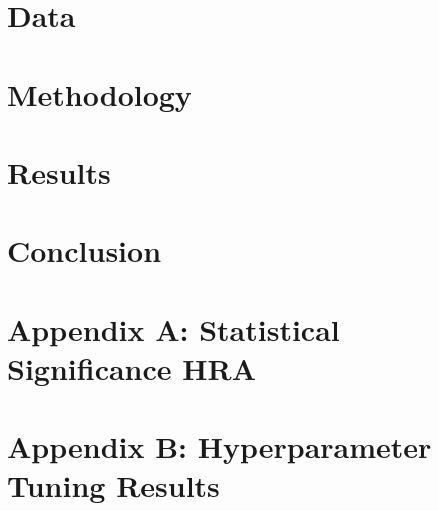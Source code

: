\documentclass[a4paper,11pt]{article}
\begin{document}
\section{Data}
\label{sec:data}


\newpage
\section{Methodology}
\label{sec:methodology}


\newpage
\section{Results}
\label{sec:results}


\newpage
\section{Conclusion}
\label{sec:conclusion}


\newpage
\section*{Appendix A: Statistical Significance HRA}
\label{sec:statistical_significance_hra}


\newpage
\section*{Appendix B: Hyperparameter Tuning Results}
\label{sec:hyperparameter_tuning_results}


\newpage
 
 
\end{document}
